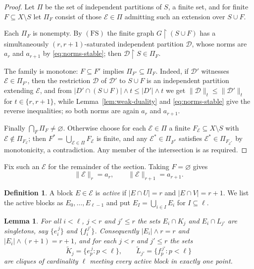 \documentclass[11pt,reqno]{amsart}
\theoremstyle{plain}
\newtheorem{lemma}[theorem]{Lemma}
\theoremstyle{definition}
\newtheorem{definition}[theorem]{Definition}
\theoremstyle{remark}
\newcommand{\restr}{\mathbin{\upharpoonright}}
\begin{document}
\begin{proof}
Let $\Pi$ be the set of independent partitions of $S$, a finite set, and for
finite $F\subseteq X\setminus S$ let $\Pi_F$ consist of those
$\mathcal E\in\Pi$ admitting such an extension over $S\cup F$.

Each $\Pi_F$ is nonempty. By $\mathrm{(FS)}$ the finite graph
$G\restr(S\cup F)$ has a simultaneously $(r,r{+}1)$-saturated independent
partition $\mathcal D$, whose norms are $a_r$ and $a_{r+1}$ by
\eqref{eq:norms-stable}; then $\mathcal D\restr S\in\Pi_F$.

The family is monotone: $F\subseteq F'$ implies $\Pi_{F'}\subseteq\Pi_F$.
Indeed, if $\mathcal D'$ witnesses $\mathcal E\in\Pi_{F'}$, then the
restriction $\mathcal D$ of $\mathcal D'$ to $S\cup F$ is an independent
partition extending $\mathcal E$, and from
$|D'\cap(S\cup F)|\wedge t\le|D'|\wedge t$ we get
$\lVert\mathcal D\rVert_t\le\lVert\mathcal D'\rVert_t$ for $t\in\{r,r+1\}$,
while Lemma~\ref{lem:weak-duality} and \eqref{eq:norms-stable} give the reverse
inequalities; so both norms are again $a_r$ and $a_{r+1}$.

Finally $\bigcap_F\Pi_F\neq\varnothing$. Otherwise choose for each
$\mathcal E\in\Pi$ a finite $F_{\mathcal E}\subseteq X\setminus S$ with
$\mathcal E\notin\Pi_{F_{\mathcal E}}$; then
$F^{*}=\bigcup_{\mathcal E\in\Pi}F_{\mathcal E}$ is finite, and any
$\mathcal E^{*}\in\Pi_{F^{*}}$ satisfies
$\mathcal E^{*}\in\Pi_{F_{\mathcal E^{*}}}$ by monotonicity, a contradiction.
Any member of the intersection is as required.
\end{proof}

Fix such an $\mathcal E$ for the remainder of the section. Taking
$F=\varnothing$ gives
\begin{equation}
\lVert\mathcal E\rVert_r=a_r,
\qquad
\lVert\mathcal E\rVert_{r+1}=a_{r+1}.
\label{eq:template-norms}
\end{equation}

\begin{definition}
\label{def:active}
A block $E\in\mathcal E$ is \emph{active} if $|E\cap U|=r$ and
$|E\cap V|=r+1$. We list the active blocks as $E_0,\dots,E_{\ell-1}$ and put
$E_I=\bigcup_{i\in I}E_i$ for $I\subseteq\ell$.
\end{definition}

\begin{lemma}
\label{lem:active-points}
For all $i<\ell$, $j<r$ and $j'\le r$ the sets $E_i\cap K_j$ and
$E_i\cap L_{j'}$ are singletons, say $\{e_i^{\,j}\}$ and $\{f_i^{\,j'}\}$.
Consequently $|E_i|\wedge r=r$ and $|E_i|\wedge(r+1)=r+1$, and for each $j<r$
and $j'\le r$ the sets
\[
\widetilde K_j=\{e_p^{\,j}:p<\ell\},
\qquad
\widetilde L_{j'}=\{f_p^{\,j'}:p<\ell\}
\]
are cliques of cardinality $\ell$ meeting every active block in exactly one
point.
\end{lemma}
\end{document}
